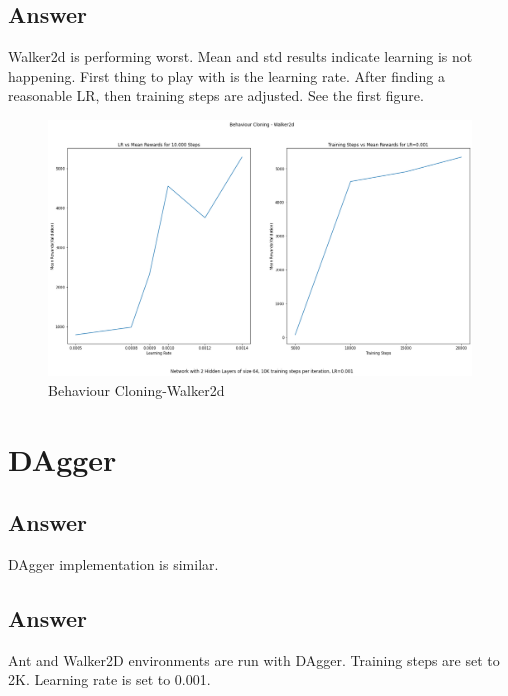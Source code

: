 \documentclass[11pt]{article}
\begin{document}
    \subsection{Answer}

    Walker2d is performing worst.
    Mean and std results indicate learning is not happening.
    First thing to play with is the learning rate.
    After finding a reasonable LR, then training steps are adjusted.
    See the first figure.


    \begin{figure}
        \centering
        \hspace*{-0.5in}
        \includegraphics[scale=0.35]{q1.3_plots}
        \caption{Behaviour Cloning-Walker2d}
    \end{figure}


    \section{DAgger}

    \subsection{Answer}

    DAgger implementation is similar.

    \subsection{Answer}

    Ant and Walker2D environments are run with DAgger.
    Training steps are set to 2K. Learning rate is set to 0.001.
\end{document}

